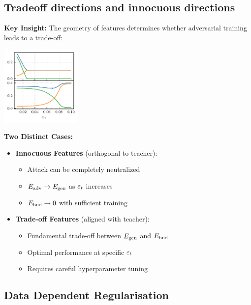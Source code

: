 \documentclass[a0paper,fleqn]{betterportraitposter}
\theoremstyle{plain}
\theoremstyle{definition}
\theoremstyle{remark}
\begin{document}
{\begin{multicols}{3}
\subsection{Tradeoff directions and innocuous directions}

\textbf{Key Insight:} The geometry of features determines whether adversarial training leads to a trade-off:

\begin{center}
\includegraphics[width=0.3\textwidth]{Assets/optimal_defense.pdf}
\end{center}

\textbf{Two Distinct Cases:}

\begin{itemize}
    \item \textbf{Innocuous Features} (orthogonal to teacher):
    \begin{itemize}
        \item Attack can be completely neutralized
        \item $E_{\mathrm{adv}} \to E_{\mathrm{gen}}$ as $\varepsilon_t$ increases
        \item $E_{\mathrm{bnd}} \to 0$ with sufficient training
    \end{itemize}
    
    \item \textbf{Trade-off Features} (aligned with teacher):
    \begin{itemize}
        \item Fundamental trade-off between $E_{\mathrm{gen}}$ and $E_{\mathrm{bnd}}$
        \item Optimal performance at specific $\varepsilon_t$
        \item Requires careful hyperparameter tuning
    \end{itemize}
\end{itemize}

\subsection{Data Dependent Regularisation}


\end{multicols}}
\end{document}
